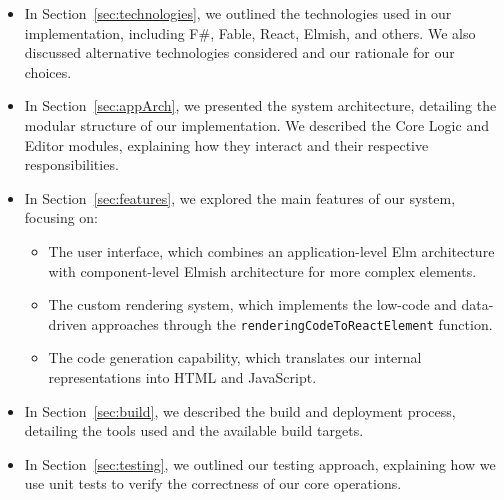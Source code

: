 \begin{itemize}
	\item In Section~\ref{sec:technologies}, we outlined the technologies used in our implementation, including F\#, Fable, React, Elmish, and others.
	      We also discussed alternative technologies considered and our rationale for our choices.

	\item In Section~\ref{sec:appArch}, we presented the system architecture,
	      detailing the modular structure of our implementation.
	      We described the Core Logic and Editor modules, explaining how they interact and their respective responsibilities.

	\item In Section~\ref{sec:features}, we explored the main features of our system, focusing on:
	      \begin{itemize}
		      \item The user interface, which combines an application-level Elm architecture with component-level Elmish architecture for more complex elements.
		      \item The custom rendering system, which implements the low-code and data-driven approaches through the \texttt{renderingCodeToReactElement} function.
		      \item The code generation capability, which translates our internal representations into HTML and JavaScript.
	      \end{itemize}

	\item In Section~\ref{sec:build}, we described the build and deployment process, detailing the tools used and the available build targets.

	\item In Section~\ref{sec:testing}, we outlined our testing approach, explaining how we use unit tests to verify the correctness of our core operations.
\end{itemize}






